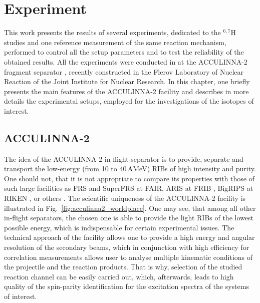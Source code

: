 \section{Experiment}

This work presents the results of several experiments, dedicated to the $^{6,7}$H studies and one reference measurement of the same reaction mechanism, performed to control all the setup parameters and to test the reliability of the obtained results.
All the experiments were conducted in at the ACCULINNA-2 fragment separator \cite{Fomichev:2018}, recently constructed in the Flerov Laboratory of Nuclear Reaction of the Joint Institute for Nuclear Research. 
In this chapter, one briefly presents the main features of the ACCULINNA-2 facility and describes in more details the experimental setups, employed for the investigations of the isotopes of interest.

\subsection{ACCULINNA-2}

The idea of the ACCULINNA-2 in-flight separator is to provide, separate and transport the low-energy (from 10 to 40\,AMeV) RIBs of high intensity and purity. 
One should not, that it is not appropriate to compare its properties with those of such large facilities as FRS \cite{geissel:1992} and SuperFRS \cite{geissel:2003,winkler:2008} at FAIR, ARIS at FRIB \cite{gao:2015}, BigRIPS at RIKEN \cite{kubo:2003}, or others \cite{cuttone:2007,www:ganil,www:isolde}.
The scientific uniqueness of the ACCULINNA-2 facility is illustrated in Fig.\ \ref{fig:acculinna2_worldplace}.
One may see, that among all other in-flight separators, the chosen one is able to provide the light RIBs of the lowest possible energy, which is indispensable for certain experimental issues.
The technical approach of the facility allows one to provide a high energy and angular resolution of the secondary beams, which in conjunction with high efficiency for correlation measurements allows user to analyse multiple kinematic conditions of the projectile and the reaction products.  
That is why, selection of the studied reaction channel can be easily carried out, which, afterwards, leads to high quality of the spin-parity identification for the excitation spectra of the systems of interest.

